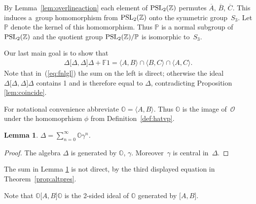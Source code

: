 \documentclass[pdftex]{sigma}
\numberwithin{equation}{section}
\newtheorem{Lemma}[Theorem]{Lemma}
\begin{document}
\begin{Definition}
\label{def:P}
By Lemma~\ref{lem:overlineaction}
each element of
${\rm  {PSL}}_2(\mathbb Z)$
permutes $\overline A$, $\overline B$, $\overline C$. This
induces a~group homomorphism
from ${\rm  {PSL}}_2(\mathbb Z)$ onto the symmetric group~$S_3$.
Let $\mathbb P$ denote the  kernel of this homomorphism.
Thus $\mathbb P$ is a normal subgroup of
${\rm  {PSL}}_2(\mathbb Z)$
and the quotient group
${\rm  {PSL}}_2(\mathbb Z)/\mathbb P$ is isomorphic to~$S_3$.
\end{Definition}

Our last main goal is to show that
\begin{gather}
\label{eq:fnlgl}
\Delta \lbrack \Delta ,\Delta \rbrack \Delta + \mathbb F 1 =
\langle A,B\rangle
\cap
\langle B,C\rangle
\cap
\langle A,C\rangle.
\end{gather}
 Note that in~(\ref{eq:fnlgl}) the sum on the left is
direct; otherwise
the ideal
$\Delta \lbrack \Delta ,\Delta \rbrack \Delta$ contains 1
and is therefore equal to $\Delta$, contradicting
Proposition
\ref{lem:coincide}.


\begin{Definition}
\label{def:hatu}
For notational convenience abbreviate
$\mathbb O =\langle A,B\rangle$. Thus
$\mathbb O$ is the image of~$\mathcal O$ under
the homomoprhism $\phi$
from Def\/inition~\ref{def:hatvp}.
\end{Definition}





\begin{Lemma}
\label{lem:notdir}
$\Delta = \sum_{n=0}^\infty \mathbb O \gamma^n$.
\end{Lemma}

\begin{proof}
 The
 algebra $\Delta $ is generated by
 $\mathbb O$, $\gamma$.
Moreover~$\gamma$ is central in~$\Delta $.
\end{proof}

\begin{Note}  The sum in Lemma
\ref{lem:notdir}
is not direct, by the third displayed equation in
Theorem~\ref{prop:altpres}.
\end{Note}




Note that
$\mathbb O\lbrack  A,B\rbrack \mathbb  O$
is the 2-sided ideal of
$\mathbb  O$ generated by
$\lbrack  A,B\rbrack$.
\end{document}
